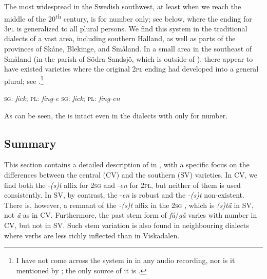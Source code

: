 \documentclass[output=paper,colorlinks,citecolor=brown,draft,draftmode]{langscibook}
\begin{document}
The most widespread  in the Swedish southwest, at least when we reach the middle of the 20\textsuperscript{th} century, is  for number only; see  below, where the ending for 3\textsc{pl} is generalized to all plural persons. We find this system in the traditional dialects of a vast area, including southern Halland, as well as parts of the provinces of Skåne, Blekinge, and Småland. In a small area in the southeast of Småland (in the parish of Södra Sandsjö, which is outside of ), there appear to have existed varieties where the original 2\textsc{pl} ending had developed into a general plural; see .\footnote{I have not come across the system in  in any audio recording, nor is it mentioned by \citet{Horn2015,Horn2017}; the only source of it is \citet{Granstrom1915}.}


\ea\label{ex:petzell:24}
\ea\label{ex:petzell:24a}  \textsc{sg}:  \hspace{\tabcolsep}  \textit{fick};  \hspace{2\tabcolsep}    \textsc{pl:} \hspace{\tabcolsep}  \textit{fing-e}
\ex\label{ex:petzell:24b}  \textsc{sg}:  \hspace{\tabcolsep}  \textit{fick};  \hspace{2\tabcolsep}    \textsc{pl:} \hspace{\tabcolsep}  \textit{fing-en}
\z
\z


As can be seen, the  is intact even in the dialects with  only for number.


\subsection{Summary}\label{sec:petzell:3.3}


This section contains a detailed description of  in , with a specific focus on the differences between the central (CV) and the southern (SV) varieties. In CV, we find both the -\textit{(s)t} affix for 2\textsc{sg} and -\textit{en} for 2\textsc{pl,} but neither of them is used consistently. In SV, by contrast, the -\textit{en} is robust and the \textit{-(s)t} non-existent. There is, however, a remnant of the \textit{-(s)t} affix in the 2\textsc{sg} , which is \textit{(s)tä} in SV, not \textit{ä} as in CV. Furthermore, the past  stem form of \textit{få}/\textit{gå} varies with number in CV, but not in SV. Such stem variation is also found in neighbouring dialects where verbs are less richly inflected than in Viskadalen.
\end{document}
